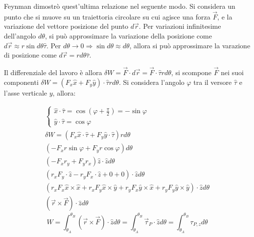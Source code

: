 \documentclass{article}
\numberwithin{equation}{subsection}
\begin{document}
Feynman dimostrò quest'ultima relazione nel seguente modo. Si considera un punto che si 
muove su un traiettoria circolare su cui agisce una forza $\vec{F}$, 
e la variazione del vettore posizione del punto $d\vec{r}$. Per 
variazioni infinitesime dell'angolo $d\theta$, si può approssimare la variazione 
della posizione come $d\vec{r}\approx r\sin d\theta\hat{\tau}$. Per 
$d\theta\to 0\Rightarrow \sin d\theta\approx d\theta$, allora si può 
approssimare la varazione di posizione come $d\vec{r}=rd\theta\hat{\tau}$. 


Il differenziale del lavoro è allora $\delta W =\vec{F}\cdot d\vec{r}=\vec{F}\cdot\hat{\tau}rd\theta$, 
si scompone $\vec{F}$ nei suoi componenti $\delta W=(F_x\hat{x}+F_y\hat{y})\cdot\hat{\tau}rd\theta$. 
Si considera l'angolo $\varphi$ tra il versore $\hat{\tau}$ e l'asse 
verticale $y$, allora: 

\begin{gather*}
    \begin{cases}
        \displaystyle\hat{x}\cdot\hat{\tau}=\cos\left(\varphi+\displaystyle\frac{\pi}{2}\right)=-\sin\varphi\\
        \displaystyle\hat{y}\cdot\hat{\tau}=\cos\varphi
    \end{cases}\\
    \delta W =(F_x\hat{x}\cdot\hat{\tau}+F_y\hat{y}\cdot\hat{\tau})rd\theta\\
    (-F_xr\sin\varphi+F_yr\cos\varphi)d\theta\\
    (-F_xr_y+F_yr_x)\hat{z}\cdot\hat{z}d\theta\\
    (r_xF_y\cdot\hat{z}-r_yF_x\cdot\hat{z}+0+0)\cdot\hat{z}d\theta\\
    (r_xF_x\hat{x}\times\hat{x}+r_xF_y\hat{x}\times\hat{y}+r_yF_x\hat{y}\times\hat{x}+r_yF_y\hat{y}\times\hat{y})\cdot\hat{z}d\theta\\
    (\vec{r}\times\vec{F})\cdot\hat{z}d\theta
\end{gather*}
\begin{equation}
    W=\displaystyle\int_{\theta_A}^{\theta_B}(\vec{r}\times\vec{F})\cdot\hat{z}d\theta=\int_{\theta_A}^{\theta_B}\vec{\tau}_P\cdot\hat{z}d\theta=\int_{\theta_A}^{\theta_B}{\tau}_{P,z}d\theta
\end{equation}
\end{document}
